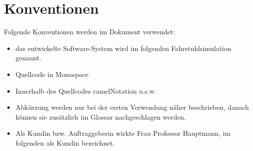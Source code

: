 \section*{Konventionen}
Folgende Konventionen werden im Dokument verwendet:\\
\begin{itemize}
	\item das entwickelte Software-System wird im folgenden Fahrstuhlsimulation genannt.
	\item Quellcode in Monospace
	\item Innerhalb des Quellcodes camelNotation u.s.w.
	\item Abkürzung werden nur bei der ersten Verwendung näher beschrieben, danach können sie zusätzlich im Glossar nachgeschlagen werden.
	\item Als Kundin bzw. Auftraggeberin wirkte Frau Professor Hauptmann, im folgenden als Kundin bezeichnet.
\end{itemize}
